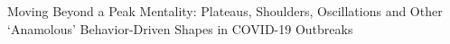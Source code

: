 Moving Beyond a Peak Mentality: Plateaus, Shoulders, Oscillations and Other `Anamolous' Behavior-Driven Shapes in COVID-19 Outbreaks
